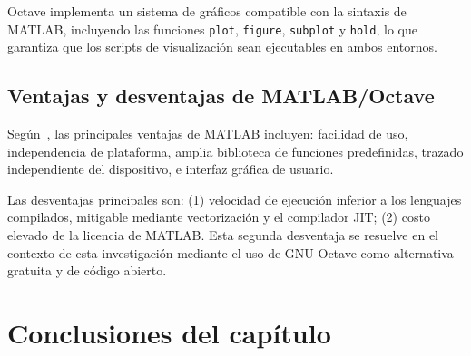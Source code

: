 Octave implementa un sistema de gráficos compatible con la sintaxis de MATLAB, incluyendo las funciones \texttt{plot}, \texttt{figure}, \texttt{subplot} y \texttt{hold}, lo que garantiza que los scripts de visualización sean ejecutables en ambos entornos.

\subsection{Ventajas y desventajas de MATLAB/Octave}
\label{sec:2.4.3}

Según~\cite{chapman2020}, las principales ventajas de MATLAB incluyen: facilidad de uso, independencia de plataforma, amplia biblioteca de funciones predefinidas, trazado independiente del dispositivo, e interfaz gráfica de usuario.

Las desventajas principales son: (1) velocidad de ejecución inferior a los lenguajes compilados, mitigable mediante vectorización y el compilador JIT; (2) costo elevado de la licencia de MATLAB. Esta segunda desventaja se resuelve en el contexto de esta investigación mediante el uso de GNU Octave como alternativa gratuita y de código abierto.

\section{Conclusiones del capítulo}
\label{sec:2.5}

